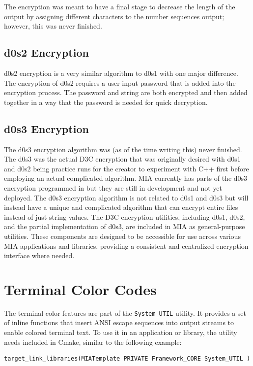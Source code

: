 The encryption was meant to have a final stage to decrease the length of the output by assigning different characters to the number sequences output; however, this was never finished.

\subsection{d0s2 Encryption}

d0s2 encryption is a very similar algorithm to d0s1 with one major difference. The encryption of d0s2 requires a user input password that is added into the encryption process. The password and string are both encrypted and then added together in a way that the password is needed for quick decryption.

\subsection{d0s3 Encryption}

The d0s3 encryption algorithm was (as of the time writing this) never finished. The d0s3 was the actual D3C encryption that was originally desired with d0s1 and d0s2 being practice runs for the creator to experiment with C++ first before employing an actual complicated algorithm. MIA currently has parts of the d0s3 encryption programmed in but they are still in development and not yet deployed. The d0s3 encryption algorithm is not related to d0s1 and d0s3 but will instead have a unique and complicated algorithm that can encrypt entire files instead of just string values. The D3C encryption utilities, including d0s1, d0s2, and the partial implementation of d0s3, are included in MIA as general-purpose utilities. These components are designed to be accessible for use across various MIA applications and libraries, providing a consistent and centralized encryption interface where needed.


















\section{Terminal Color Codes}\label{section:terminal_color_codes_utils}

The terminal color features are part of the \texttt{System\_UTIL} utility. It provides a set of inline functions that insert ANSI escape sequences into output streams to enable colored terminal text. To use it in an application or library, the utility needs included in Cmake, similar to the following example:
\begin{lstlisting}[style=shellstyle]
target_link_libraries(MIATemplate PRIVATE Framework_CORE System_UTIL )
\end{lstlisting}

